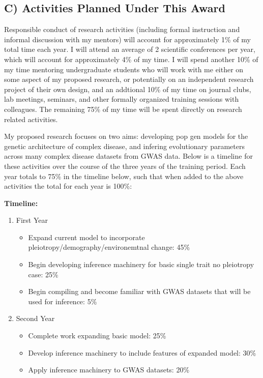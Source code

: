 \documentclass[11pt]{article}
\begin{document}
\subsection*{C) Activities Planned Under This Award}

Responsible conduct of research activities (including formal instruction and informal discussion with my mentors) will account for approximately 1\% of my total time each year. I will attend an average of 2 scientific conferences per year, which will account for approximately 4\% of my time. I will spend another 10\% of my time mentoring undergraduate students who will work with me either on some aspect of my proposed research, or potentially on an independent research project of their own design, and an addtional 10\% of my time on journal clubs, lab meetings, seminars, and other formally organized training sessions with colleagues. The remaining 75\% of my time will be spent directly on research related activities.

My proposed research focuses on two aims: developing pop gen models for the genetic architecture of complex disease, and infering evolutionary parameters across many complex disease datasets from GWAS data. Below is a timeline for these activities over the course of the three years of the training period. Each year totals to 75\% in the timeline below, such that when added to the above activities the total for each year is 100\%:

\vspace{5mm}
\noindent
\textbf{Timeline:}

\begin{enumerate}
\item First Year
  \begin{itemize}
  \item Expand current model to incorporate pleiotropy/demography/environemtnal change: 45\%
  \item Begin developing inference machinery for basic single trait no pleiotropy case: 25\%
  \item Begin compiling and become familiar with GWAS datasets that will be used for inference: 5\%
  \end{itemize}
\item Second Year
  \begin{itemize}
  \item Complete work expanding basic model: 25\%
  \item Develop inference machinery to include features of expanded model: 30\%
  \item Apply inference machinery to GWAS datasets: 20\%
  \end{itemize}
\end{enumerate}
\end{document}
